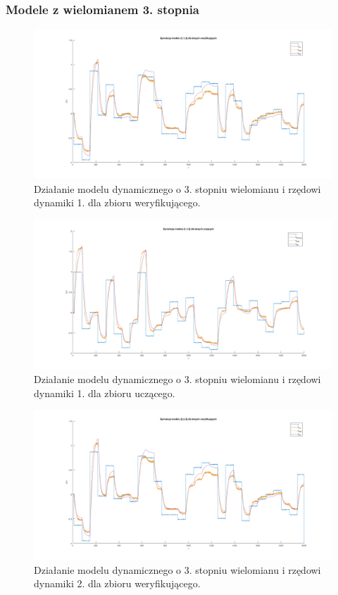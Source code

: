 \subsubsection{Modele z wielomianem 3. stopnia}
\begin{figure}[H]
\centering
\includegraphics[width=16cm,trim={5cm 1cm 5cm 1cm},clip]{images/d13.png}
\caption{Działanie modelu dynamicznego o 3. stopniu wielomianu i rzędowi dynamiki 1. dla zbioru weryfikującego.}
\label{fig:d13}
\end{figure}
\begin{figure}[H]
\centering
\includegraphics[width=16cm,trim={5cm 1cm 5cm 1cm},clip]{images/d14.png}
\caption{Działanie modelu dynamicznego o 3. stopniu wielomianu i rzędowi dynamiki 1. dla zbioru uczącego.}
\label{fig:d14}
\end{figure}
\begin{figure}[H]
\centering
\includegraphics[width=16cm,trim={5cm 1cm 5cm 1cm},clip]{images/d15.png}
\caption{Działanie modelu dynamicznego o 3. stopniu wielomianu i rzędowi dynamiki 2. dla zbioru weryfikującego.}
\label{fig:d15}
\end{figure}
